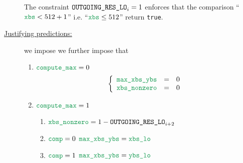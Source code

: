 \begin{description}
		\saNote{} The constraint $\texttt{OUTGOING\_RES\_LO}_{i} = 1$ enforces that the comparison ``$\locXbs < 512 + 1$'' i.e. ``$\locXbs \leq 512$'' return \texttt{true}.
	\item[\underline{Justifying \hubMod{} predictions:}] we impose
		we further impose that
		\begin{enumerate}
		        \item \If $\locComputeMax = 0$ \Then 
				\[
					\left\{ \begin{array}{lcl}
						\locMax        & = & 0 \\
						\locXbsNonzero & = & 0 \\
					\end{array} \right.
				\]
		        \item \If $\locComputeMax = 1$ \Then
			\begin{enumerate}
				\item $\locXbsNonzero = 1 - \outgoingResLo_{i + 2}$
			        \item \If $\locCmp = 0$ \Then $\locMax = \locXbsLo$
			        \item \If $\locCmp = 1$ \Then $\locMax = \locYbsLo$
			\end{enumerate}
		\end{enumerate}
\end{description}
